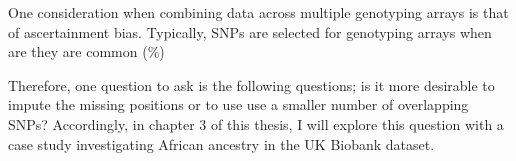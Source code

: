 One consideration when combining data across multiple genotyping arrays is that of ascertainment bias. Typically, SNPs are selected for genotyping arrays when are they are common (\%) 

Therefore, one question to ask is the following questions; is it more desirable to impute the missing positions or to use use a smaller number of overlapping SNPs? Accordingly, in chapter 3 of this thesis, I will explore this question with a case study investigating African ancestry in the UK Biobank dataset. 
 
